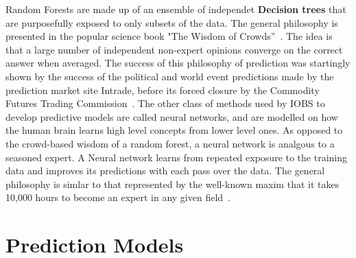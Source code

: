 \documentclass[a4paper,11pt]{article}
\begin{document}
Random Forests are made up of an ensemble of independet \textbf{Decision trees} that are purposefully exposed to only subsets of the data. The general philosophy is presented in the popular science book "The Wisdom of Crowds''~\cite{wisdom}.
The idea is that a large number of independent non-expert opinions converge on the correct answer when averaged. The success of this philosophy of prediction was startingly shown by the success of the political and world event predictions made by the prediction market site Intrade, before its forced closure by the Commodity Futures Trading Commission~\cite{cassidy}. %
 The other class of methods used by IOBS to develop predictive models are called neural networks, and are modelled on how the human brain learns high level concepts from lower level ones. 
As opposed to the crowd-based wisdom of a random forest, a neural network is analgous to a seasoned expert. 
A Neural network learns from repeated exposure to the training data and improves its predictions with each pass over the data.
 The general philosophy is simlar to that represented by the well-known maxim that it takes 10,000 hours to become an expert in any given field~\cite{outliers}.






\section{Prediction Models}
\label{sec:predmodels}
\end{document}
